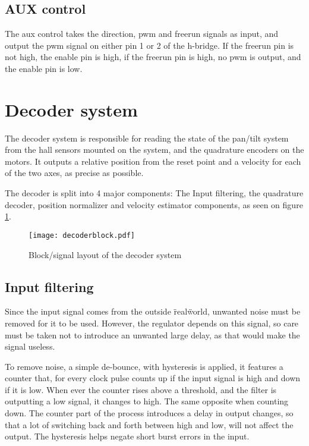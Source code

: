 \subsection{AUX control}
The aux control takes the direction, pwm and freerun signals as input, and output the pwm signal on either pin 1 or 2 of the h-bridge. If the freerun pin is not high, the enable pin is high, if the freerun pin is high, no pwm is output, and the enable pin is low.

\section{Decoder system}
The decoder system is responsible for reading the state of the pan/tilt system from the hall sensors mounted on the system, and the quadrature encoders on the motors. 
It outputs a relative position from the reset point and a velocity for each of the two axes, as precise as possible.

The decoder is split into 4 major components: The Input filtering, the quadrature decoder, position normalizer and velocity estimator components, as seen on figure \ref{fig:decoderblock}. 



\begin{figure}[htb]
\centering
\texttt{[image: decoderblock.pdf]}
\caption{Block/signal layout of the decoder system}
\label{fig:decoderblock}
\end{figure}


\subsection{Input filtering}
Since the input signal comes from the outside \"real\" world, unwanted noise must be removed for it to be used. However, the regulator depends on this signal, so care must be taken not to introduce an unwanted large delay, as that would make the signal  useless.

To remove noise, a simple de-bounce, with hysteresis is applied, it features a counter that, for every clock pulse counts up if the input signal is high and down if it is low.
When ever the counter rises above a threshold, and the filter is outputting a low signal, it changes to high. The same opposite when counting down.
The counter part of the process introduces a delay in output changes, so that a lot of switching back and forth between high and low, will not affect the output. The hysteresis helps negate short burst errors in the input. 

